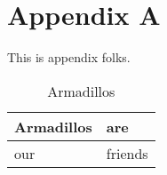 \section{Appendix A}
This is appendix folks.
\begin{table}[!htbp]
\begin{center}
\begin{tabular}{||l|l||}\hline
Armadillos & are \\\hline
our	   & friends \\\hline
\end{tabular}
\end{center}
\caption{Armadillos}\label{arm:table}
\end{table}

\clearpage
\newpage
